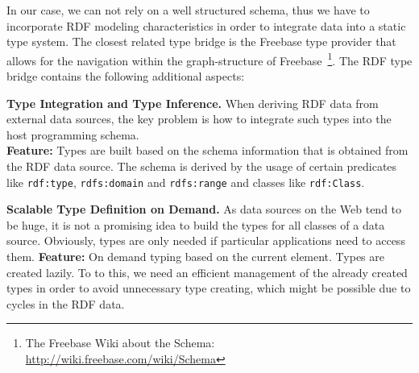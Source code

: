 \documentclass{llncs} %
\begin{document}
In our case, we can not rely on a well structured schema, thus we have to
incorporate RDF modeling characteristics in order to integrate data into
a static type system. The closest related type bridge is the Freebase  
type provider that allows for the navigation within the graph-structure of
Freebase~\footnote{The Freebase Wiki about the Schema: \url{http://wiki.freebase.com/wiki/Schema}}.
The RDF type bridge contains the following additional aspects:

\vspace{0.6em}
\noindent
\textbf{Type Integration and Type Inference.}
When deriving RDF data from external data sources, the key problem is how to integrate
such types into the host programming schema. \\
\textbf{Feature:} Types are built based on the schema information that is obtained
from the RDF data source. The schema is derived by the 
usage of certain predicates like \texttt{rdf:type}, \texttt{rdfs:domain} and \texttt{rdfs:range}
and classes like \texttt{rdf:Class}.

\vspace{0.6em}
\noindent
\textbf{Scalable Type Definition on Demand.}
As data sources on the Web tend to be huge, it is not a promising idea to
build the types for all classes of a data source.
Obviously, types are only needed if particular applications need to access them.
\textbf{Feature:} On demand typing based on the current element. Types are created lazily.
To to this, we need an efficient management of the already created types in order
to avoid unnecessary type creating, which might be possible due to cycles in the RDF data. \\




\end{document}
